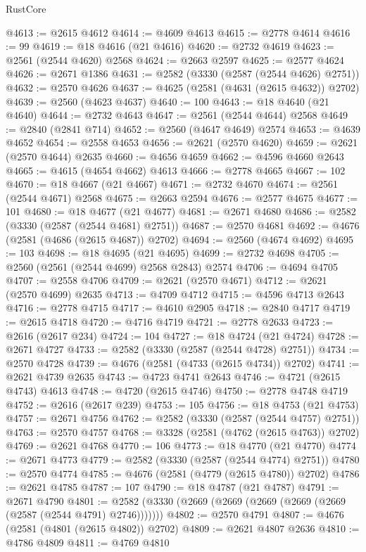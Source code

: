 \begin{lexlean}{RustCore}
\begin{coremodule}
@4613 := @2615 @4612
@4614 := @4609 @4613
@4615 := @2778 @4614
@4616 := 99
@4619 := @18 @4616 (@21 @4616)
@4620 := @2732 @4619
@4623 := @2561 (@2544 @4620) @2568
@4624 := @2663 @2597
@4625 := @2577 @4624
@4626 := @2671 @1386
@4631 := @2582 (@3330 (@2587 (@2544 @4626) @2751))
@4632 := @2570 @4626
@4637 := @4625 (@2581 (@4631 (@2615 @4632)) @2702)
@4639 := @2560 (@4623 @4637)
@4640 := 100
@4643 := @18 @4640 (@21 @4640)
@4644 := @2732 @4643
@4647 := @2561 (@2544 @4644) @2568
@4649 := @2840 (@2841 @714)
@4652 := @2560 (@4647 @4649) @2574
@4653 := @4639 @4652
@4654 := @2558 @4653
@4656 := @2621 (@2570 @4620)
@4659 := @2621 (@2570 @4644) @2635
@4660 := @4656 @4659
@4662 := @4596 @4660 @2643
@4665 := @4615 (@4654 @4662) @4613
@4666 := @2778 @4665
@4667 := 102
@4670 := @18 @4667 (@21 @4667)
@4671 := @2732 @4670
@4674 := @2561 (@2544 @4671) @2568
@4675 := @2663 @2594
@4676 := @2577 @4675
@4677 := 101
@4680 := @18 @4677 (@21 @4677)
@4681 := @2671 @4680
@4686 := @2582 (@3330 (@2587 (@2544 @4681) @2751))
@4687 := @2570 @4681
@4692 := @4676 (@2581 (@4686 (@2615 @4687)) @2702)
@4694 := @2560 (@4674 @4692)
@4695 := 103
@4698 := @18 @4695 (@21 @4695)
@4699 := @2732 @4698
@4705 := @2560 (@2561 (@2544 @4699) @2568 @2843) @2574
@4706 := @4694 @4705
@4707 := @2558 @4706
@4709 := @2621 (@2570 @4671)
@4712 := @2621 (@2570 @4699) @2635
@4713 := @4709 @4712
@4715 := @4596 @4713 @2643
@4716 := @2778 @4715
@4717 := @4610 @2905
@4718 := @2840 @4717
@4719 := @2615 @4718
@4720 := @4716 @4719
@4721 := @2778 @2633
@4723 := @2616 (@2617 @234)
@4724 := 104
@4727 := @18 @4724 (@21 @4724)
@4728 := @2671 @4727
@4733 := @2582 (@3330 (@2587 (@2544 @4728) @2751))
@4734 := @2570 @4728
@4739 := @4676 (@2581 (@4733 (@2615 @4734)) @2702)
@4741 := @2621 @4739 @2635
@4743 := @4723 @4741 @2643
@4746 := @4721 (@2615 @4743) @4613
@4748 := @4720 (@2615 @4746)
@4750 := @2778 @4748 @4719
@4752 := @2616 (@2617 @239)
@4753 := 105
@4756 := @18 @4753 (@21 @4753)
@4757 := @2671 @4756
@4762 := @2582 (@3330 (@2587 (@2544 @4757) @2751))
@4763 := @2570 @4757
@4768 := @3328 (@2581 (@4762 (@2615 @4763)) @2702)
@4769 := @2621 @4768
@4770 := 106
@4773 := @18 @4770 (@21 @4770)
@4774 := @2671 @4773
@4779 := @2582 (@3330 (@2587 (@2544 @4774) @2751))
@4780 := @2570 @4774
@4785 := @4676 (@2581 (@4779 (@2615 @4780)) @2702)
@4786 := @2621 @4785
@4787 := 107
@4790 := @18 @4787 (@21 @4787)
@4791 := @2671 @4790
@4801 := @2582 (@3330 (@2669 (@2669 (@2669 (@2669 (@2669 (@2587 (@2544 @4791) @2746)))))))
@4802 := @2570 @4791
@4807 := @4676 (@2581 (@4801 (@2615 @4802)) @2702)
@4809 := @2621 @4807 @2636
@4810 := @4786 @4809
@4811 := @4769 @4810

\end{coremodule}
\end{lexlean}
